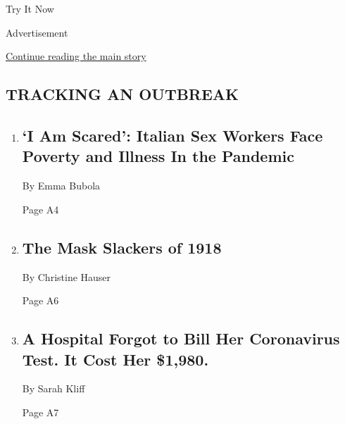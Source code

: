 Try It Now

Advertisement

\protect\hyperlink{after-mid1}{Continue reading the main story}

\hypertarget{tracking-an-outbreak}{%
\subsection{TRACKING AN OUTBREAK}\label{tracking-an-outbreak}}

\begin{enumerate}
\def\labelenumi{\arabic{enumi}.}
\item
  \href{/2020/08/03/world/europe/italy-coronavirus-prostitution-sex-work.html}{}

  \hypertarget{i-am-scared-italian-sex-workers-face-poverty-and-illness-in-the-pandemic}{%
  \subsection{`I Am Scared': Italian Sex Workers Face Poverty and
  Illness In the
  Pandemic}\label{i-am-scared-italian-sex-workers-face-poverty-and-illness-in-the-pandemic}}

  By Emma Bubola

  Page A4
\item
  \href{/2020/08/03/us/mask-protests-1918.html}{}

  \hypertarget{the-mask-slackers-of-1918-1}{%
  \subsection{The Mask Slackers of
  1918}\label{the-mask-slackers-of-1918-1}}

  By Christine Hauser

  Page A6
\item
  \href{/2020/08/03/upshot/nj-coronavirus-medical-bill.html}{}

  \hypertarget{a-hospital-forgot-to-bill-her-coronavirus-test-it-cost-her-1980}{%
  \subsection{A Hospital Forgot to Bill Her Coronavirus Test. It Cost
  Her
  \$1,980.}\label{a-hospital-forgot-to-bill-her-coronavirus-test-it-cost-her-1980}}

  By Sarah Kliff

  Page A7
\end{enumerate}

